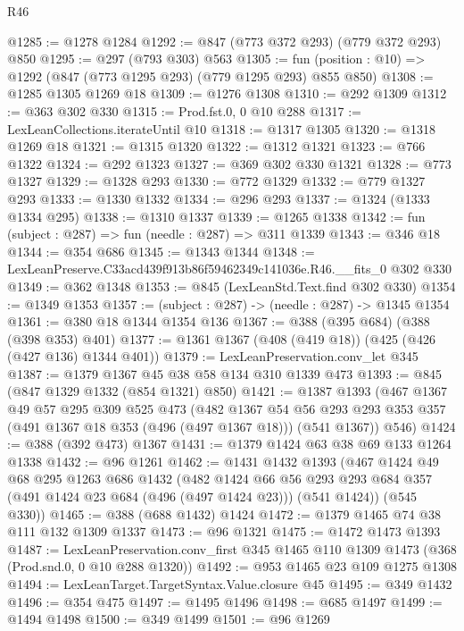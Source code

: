\begin{lexlean}{R46}
\begin{coremodule}
@1285 := @1278 @1284
@1292 := @847 (@773 @372 @293) (@779 @372 @293) @850
@1295 := @297 (@793 @303) @563
@1305 := fun (position : @10) => @1292 (@847 (@773 @1295 @293) (@779 @1295 @293) @855 @850)
@1308 := @1285 @1305 @1269 @18
@1309 := @1276 @1308
@1310 := @292 @1309
@1312 := @363 @302 @330
@1315 := Prod.fst.{0, 0} @10 @288
@1317 := LexLeanCollections.iterateUntil @10
@1318 := @1317 @1305
@1320 := @1318 @1269 @18
@1321 := @1315 @1320
@1322 := @1312 @1321
@1323 := @766 @1322
@1324 := @292 @1323
@1327 := @369 @302 @330 @1321
@1328 := @773 @1327
@1329 := @1328 @293
@1330 := @772 @1329
@1332 := @779 @1327 @293
@1333 := @1330 @1332
@1334 := @296 @293
@1337 := @1324 (@1333 @1334 @295)
@1338 := @1310 @1337
@1339 := @1265 @1338
@1342 := fun (subject : @287) => fun (needle : @287) => @311 @1339
@1343 := @346 @18
@1344 := @354 @686
@1345 := @1343 @1344
@1348 := LexLeanPreserve.C33acd439f913b86f59462349c141036e.R46.__fits_0 @302 @330
@1349 := @362 @1348
@1353 := @845 (LexLeanStd.Text.find @302 @330)
@1354 := @1349 @1353
@1357 := (subject : @287) -> (needle : @287) -> @1345 @1354
@1361 := @380 @18 @1344 @1354 @136
@1367 := @388 (@395 @684) (@388 (@398 @353) @401)
@1377 := @1361 @1367 (@408 (@419 @18)) (@425 (@426 (@427 @136) @1344 @401))
@1379 := LexLeanPreservation.conv_let @345
@1387 := @1379 @1367 @45 @38 @58 @134 @310 @1339 @473
@1393 := @845 (@847 @1329 @1332 (@854 @1321) @850)
@1421 := @1387
    @1393
    (@467
      @1367
      @49
      @57
      @295
      @309
      @525
      @473
      (@482
        @1367
        @54
        @56
        @293
        @293
        @353
        @357
        (@491 @1367 @18 @353 (@496 (@497 @1367 @18)))
        (@541 @1367))
      @546)
@1424 := @388 (@392 @473) @1367
@1431 := @1379 @1424 @63 @38 @69 @133 @1264 @1338
@1432 := @96 @1261
@1462 := @1431
    @1432
    @1393
    (@467
      @1424
      @49
      @68
      @295
      @1263
      @686
      @1432
      (@482
        @1424
        @66
        @56
        @293
        @293
        @684
        @357
        (@491 @1424 @23 @684 (@496 (@497 @1424 @23)))
        (@541 @1424))
      (@545 @330))
@1465 := @388 (@688 @1432) @1424
@1472 := @1379 @1465 @74 @38 @111 @132 @1309 @1337
@1473 := @96 @1321
@1475 := @1472 @1473 @1393
@1487 := LexLeanPreservation.conv_first
    @345
    @1465
    @110
    @1309
    @1473
    (@368 (Prod.snd.{0, 0} @10 @288 @1320))
@1492 := @953 @1465 @23 @109 @1275 @1308
@1494 := LexLeanTarget.TargetSyntax.Value.closure @45
@1495 := @349 @1432
@1496 := @354 @475
@1497 := @1495 @1496
@1498 := @685 @1497
@1499 := @1494 @1498
@1500 := @349 @1499
@1501 := @96 @1269

\end{coremodule}
\end{lexlean}
